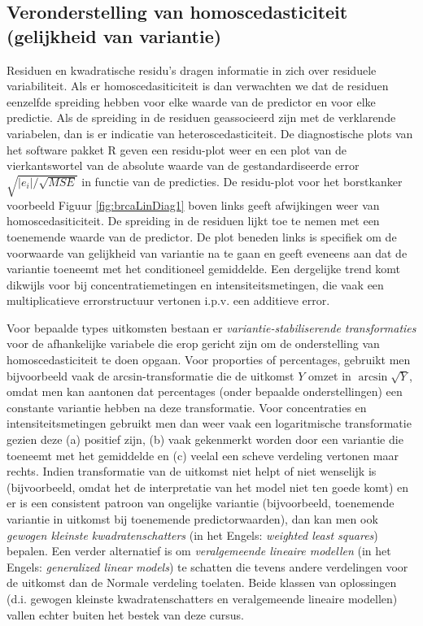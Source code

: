 \documentclass[
  12pt,dutch,coursenotes]{book}
\begin{document}
\hypertarget{veronderstelling-van-homoscedasticiteit-gelijkheid-van-variantie}{%
\subsection{Veronderstelling van homoscedasticiteit (gelijkheid van variantie)}\label{veronderstelling-van-homoscedasticiteit-gelijkheid-van-variantie}}

Residuen en kwadratische residu's dragen informatie in zich over residuele variabiliteit.
Als er homoscedasiticiteit is dan verwachten we dat de residuen eenzelfde spreiding hebben voor elke waarde van de predictor en voor elke predictie.
Als de spreiding in de residuen geassocieerd zijn met de verklarende variabelen, dan is er indicatie van heteroscedasticiteit.
De diagnostische plots van het software pakket R geven een residu-plot weer en een plot van de vierkantswortel van de absolute waarde van de gestandardiseerde error \(\sqrt{|e_i|/\sqrt{MSE}}\) in functie van de predicties.
De residu-plot voor het borstkanker voorbeeld Figuur \ref{fig:brcaLinDiag1} boven links geeft afwijkingen weer van homoscedasiticiteit.
De spreiding in de residuen lijkt toe te nemen met een toenemende waarde van de predictor.
De plot beneden links is specifiek om de voorwaarde van gelijkheid van variantie na te gaan en geeft eveneens aan dat de variantie toeneemt met het conditioneel gemiddelde.
Een dergelijke trend komt dikwijls voor bij concentratiemetingen en intensiteitsmetingen, die vaak een multiplicatieve errorstructuur vertonen i.p.v. een additieve error.

Voor bepaalde types uitkomsten bestaan er \emph{variantie-stabiliserende transformaties} voor de afhankelijke variabele die erop gericht zijn om de onderstelling van homoscedasticiteit te doen opgaan. Voor proporties of percentages, gebruikt men bijvoorbeeld vaak de arcsin-transformatie die de uitkomst \(Y\) omzet in \(\arcsin\sqrt{Y}\), omdat men kan aantonen dat percentages (onder bepaalde onderstellingen) een constante variantie hebben na deze transformatie.
Voor concentraties en intensiteitsmetingen gebruikt men dan weer vaak een logaritmische transformatie gezien deze (a) positief zijn, (b) vaak gekenmerkt worden door een variantie die toeneemt met het gemiddelde en (c) veelal een scheve verdeling vertonen maar rechts.
Indien transformatie van de uitkomst niet helpt of niet wenselijk is (bijvoorbeeld, omdat het de interpretatie van het model niet ten goede komt) en er is een consistent patroon van ongelijke variantie (bijvoorbeeld, toenemende variantie in uitkomst bij toenemende predictorwaarden), dan kan men ook \emph{gewogen kleinste kwadratenschatters} (in het Engels: \emph{weighted least squares}) bepalen. Een verder alternatief is om \emph{veralgemeende lineaire modellen} (in het Engels: \emph{generalized linear models}) te schatten die tevens andere verdelingen voor de uitkomst dan de Normale verdeling toelaten. Beide klassen van oplossingen (d.i. gewogen kleinste kwadratenschatters en veralgemeende lineaire modellen) vallen echter buiten het bestek van deze cursus.
\end{document}
